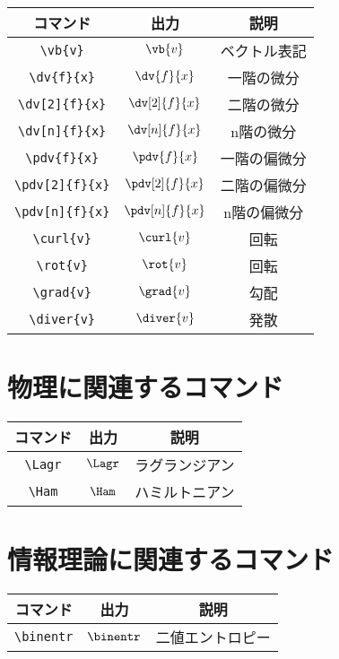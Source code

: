 \begin{longtable}{ccc}
    \toprule
    コマンド             & 出力                            & 説明         \\
    \midrule
    \verb|\vb{v}|        & \(\vb{v}\)                      & ベクトル表記 \\
    \verb|\dv{f}{x}|     & \(\displaystyle \dv{f}{x}\)     & 一階の微分   \\
    \verb|\dv[2]{f}{x}|  & \(\displaystyle \dv[2]{f}{x}\)  & 二階の微分   \\
    \verb|\dv[n]{f}{x}|  & \(\displaystyle \dv[n]{f}{x}\)  & n階の微分    \\
    \verb|\pdv{f}{x}|    & \(\displaystyle \pdv{f}{x}\)    & 一階の偏微分 \\
    \verb|\pdv[2]{f}{x}| & \(\displaystyle \pdv[2]{f}{x}\) & 二階の偏微分 \\
    \verb|\pdv[n]{f}{x}| & \(\displaystyle \pdv[n]{f}{x}\) & n階の偏微分  \\
    \verb|\curl{v}|      & \(\displaystyle \curl{v}\)      & 回転         \\
    \verb|\rot{v}|       & \(\displaystyle \rot{v}\)       & 回転         \\
    \verb|\grad{v}|      & \(\displaystyle \grad{v}\)      & 勾配         \\
    \verb|\diver{v}|     & \(\displaystyle \diver{v}\)     & 発散         \\
    \bottomrule
\end{longtable}

\section{物理に関連するコマンド}

\begin{longtable}{ccc}
    \toprule
    コマンド     & 出力      & 説明           \\
    \midrule
    \verb|\Lagr| & \(\Lagr\) & ラグランジアン \\
    \verb|\Ham|  & \(\Ham\)  & ハミルトニアン \\
    \bottomrule
\end{longtable}

\section{情報理論に関連するコマンド}

\begin{longtable}{ccc}
    \toprule
    コマンド        & 出力         & 説明             \\
    \midrule
    \verb|\binentr| & \(\binentr\) & 二値エントロピー \\
    \bottomrule
\end{longtable}